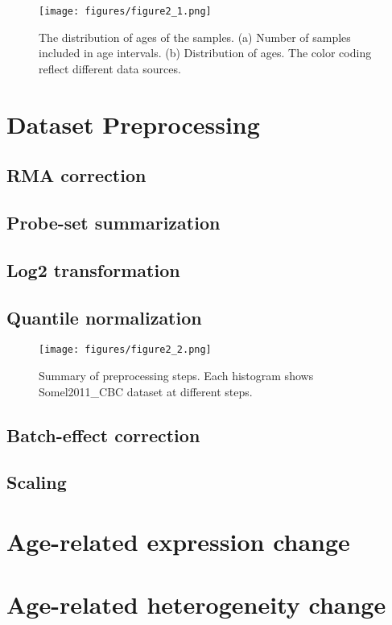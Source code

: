\begin{figure}[h]
\centering
\texttt{[image: figures/figure2\_1.png]}
\caption{The distribution of ages of the samples. (a) Number of samples included in age intervals. (b) Distribution of ages. The color coding reflect different data sources. }
\label{fig:fig2.1}
\end{figure}


\section{Dataset Preprocessing}
\subsection{RMA correction}

\subsection{Probe-set summarization}

\subsection{Log2 transformation}

\subsection{Quantile normalization}

\begin{figure}[h]
\centering
\texttt{[image: figures/figure2\_2.png]}
\caption{Summary of preprocessing steps. Each histogram shows Somel2011\_CBC dataset at different steps.}
\label{fig:fig2.2}
\end{figure}

\subsection{Batch-effect correction}

\subsection{Scaling}

\section{Age-related expression change}

\section{Age-related heterogeneity change}


